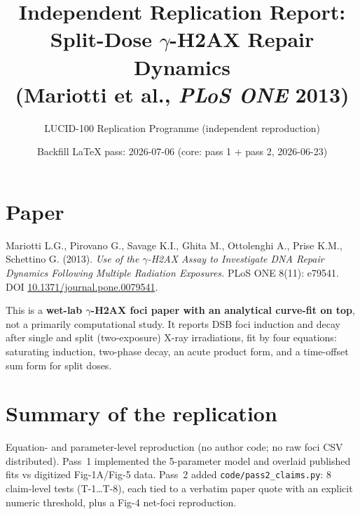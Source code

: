 \documentclass[11pt]{article}
\title{Independent Replication Report:\\
Split-Dose $\gamma$-H2AX Repair Dynamics\\
(Mariotti et al., \textit{PLoS ONE} 2013)}
\author{LUCID-100 Replication Programme (independent reproduction)}
\date{Backfill LaTeX pass: 2026-07-06 \quad (core: pass 1 + pass 2, 2026-06-23)}
\begin{document}
\maketitle

\section{Paper}
Mariotti L.G., Pirovano G., Savage K.I., Ghita M., Ottolenghi A., Prise K.M.,
Schettino G. (2013). \emph{Use of the $\gamma$-H2AX Assay to Investigate DNA
Repair Dynamics Following Multiple Radiation Exposures.} PLoS ONE 8(11): e79541.
DOI \href{https://doi.org/10.1371/journal.pone.0079541}{10.1371/journal.pone.0079541}.

This is a \textbf{wet-lab $\gamma$-H2AX foci paper with an analytical curve-fit
on top}, not a primarily computational study. It reports DSB foci induction and
decay after single and split (two-exposure) X-ray irradiations, fit by four
equations: saturating induction, two-phase decay, an acute product form, and a
time-offset sum form for split doses.

\section{Summary of the replication}
Equation- and parameter-level reproduction (no author code; no raw foci CSV
distributed). Pass~1 implemented the 5-parameter model and overlaid published
fits vs digitized Fig-1A/Fig-5 data. Pass~2 added \texttt{code/pass2\_claims.py}:
8 claim-level tests (T-1\dots T-8), each tied to a verbatim paper quote with an
explicit numeric threshold, plus a Fig-4 net-foci reproduction.
\end{document}
